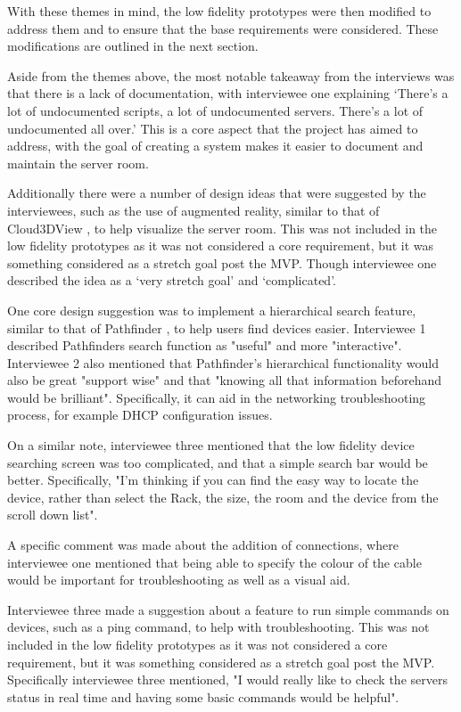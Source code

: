 \documentclass [11pt,a4paper]{article}
\begin{document}
With these themes in mind, the low fidelity prototypes were then modified to address them and to ensure that the base requirements were considered. These modifications are outlined in the next section. 


Aside from the themes above, the most notable takeaway from the interviews was that there is a lack of documentation, with interviewee one explaining `There's a lot of undocumented scripts, a lot of undocumented servers. There's a lot of undocumented all over.' This is a core aspect that the project has aimed to address, with the goal of creating a system makes it easier to document and maintain the server room. 

Additionally there were a number of design ideas that were suggested by the interviewees, such as the use of augmented reality, similar to that of Cloud3DView \cite{cloud3dview}, to help visualize the server room. This was not included in the low fidelity prototypes as it was not considered a core requirement, but it was something considered as a stretch goal post the MVP. Though interviewee one described the idea as a `very stretch goal' and `complicated'.

One core design suggestion was to implement a hierarchical search feature, similar to that of Pathfinder \cite{PathfinderMobile}, to help users find devices easier. Interviewee 1 described Pathfinders search function as "useful" and more "interactive". Interviewee 2 also mentioned that Pathfinder's hierarchical functionality would also be great "support wise" and that "knowing all that information beforehand would be brilliant". Specifically, it can aid in the networking troubleshooting process, for example DHCP configuration issues.

On a similar note, interviewee three mentioned that the low fidelity device searching screen was too complicated, and that a simple search bar would be better. Specifically, "I'm thinking if you can find the easy way to locate the device, rather than select the Rack, the size, the room and the device from the scroll down list". 

A specific comment was made about the addition of connections, where interviewee one mentioned that being able to specify the colour of the cable would be important for troubleshooting as well as a visual aid.  

Interviewee three made a suggestion about a feature to run simple commands on devices, such as a ping command, to help with troubleshooting. This was not included in the low fidelity prototypes as it was not considered a core requirement, but it was something considered as a stretch goal post the MVP. Specifically interviewee three mentioned, "I would really like to check the servers status in real time and having some basic commands would be helpful".
\end{document}
